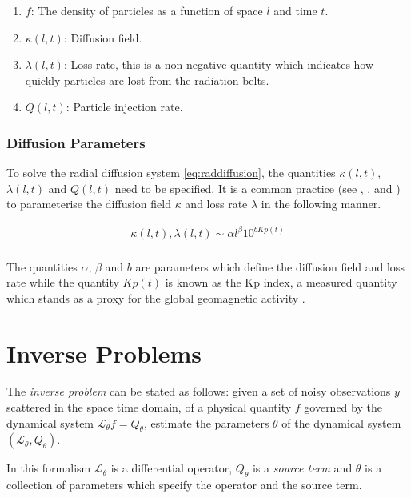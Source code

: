 \documentclass{article}
\begin{document}
\begin{enumerate}
\item $f$: The density of particles as a function of space $l$ and
  time $t$.
\item $\kappa(l, t)$: Diffusion field.
\item $\lambda(l, t)$: Loss rate, this is a non-negative
  quantity which indicates how quickly particles are lost from the
  radiation belts.
\item $Q(l, t)$: Particle injection rate.
\end{enumerate}

\subsubsection*{Diffusion Parameters}

To solve the radial diffusion system \ref{eq:raddiffusion}, the
quantities $\kappa(l, t)$, $\lambda(l, t)$ and $Q(l, t)$ need to be
specified. It is a common practice (see \citet{GRL:GRL10762},
\citet{JGRA:JGRA15067}, \citet{JGRA:JGRA18021} and
\citet{GRL:GRL22815}) to parameterise the diffusion field
$\kappa$ and loss rate $\lambda$ in the following manner.

\begin{align}
  \kappa(l,t), \lambda(l, t) \sim \alpha l^{\beta} 10^{b Kp(t)} \\
\end{align}

The quantities $\alpha$, $\beta$ and $b$ are parameters which define
the diffusion field and loss rate while the quantity $Kp(t)$ is known
as the Kp index, a measured quantity which stands as a proxy for the
global geomagnetic activity \cite{BartelsKp}.


\section{Inverse Problems}\label{sec:inv}

The \emph{inverse problem} can be stated as follows: given a set of
noisy observations $y$ scattered in the space time domain, of a
physical quantity $f$ governed by the dynamical system
$\mathcal{L}_{\theta} f = Q_{\theta}$, estimate the parameters $\theta$ of the
dynamical system $(\mathcal{L}_{\theta}, Q_{\theta})$.

In this formalism $\mathcal{L}_{\theta}$ is a differential operator,
$Q_{\theta}$ is a \emph{source term} and $\theta$ is a collection of parameters
which specify the operator and the source term.
\end{document}
